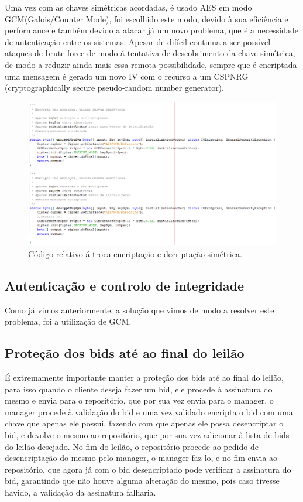 \documentclass[pdftex,12pt,a4paper]{report}
\begin{document}
Uma vez com as chaves simétricas acordadas, é usado AES em modo GCM(Galois/Counter Mode), foi escolhido este modo, devido à sua eficiência e performance e também devido a atacar já um novo problema, que é a necessidade de autenticação entre os sistemas.
Apesar de difícil continua a ser possível ataques de brute-force de modo á tentativa de descobrimento da chave simétrica, de modo a reduzir ainda mais essa remota possibilidade, sempre que é encriptada uma mensagem é gerado um novo IV com o recurso a um CSPNRG (cryptographically secure pseudo-random number generator).
\begin{figure}[h]
    \centering
    \includegraphics[width=15.0cm]{encrypt.png}
    \caption{Código relativo á troca encriptação e decriptação simétrica.}
    \label{fig:mesh1}
\end{figure}

\vskip 1.5cm
\subsection{Autenticação e controlo de integridade}
Como já vimos anteriormente, a solução que vimos de modo a resolver este problema, foi a utilização de GCM.

\vskip 1.5cm
\subsection{Proteção dos bids até ao final do leilão}
É extremamente importante manter a proteção dos bids até ao final do leilão, para isso quando o cliente deseja fazer um bid, ele procede à assinatura do mesmo e envia para o repositório, que por sua vez envia para o manager, o manager procede à validação do bid e uma vez validado encripta o bid  com uma chave que apenas ele possui, fazendo com que apenas ele possa desencriptar o bid, e devolve o mesmo ao repositório, que por sua vez adicionar à lista de bids do leilão desejado.
No fim do leilão, o repositório procede ao pedido de desencriptação do mesmo pelo manager, o manager faz-lo, e no fim envia ao repositório, que agora já com o bid desencriptado pode verificar a assinatura do bid, garantindo que não houve alguma alteração do mesmo, pois caso tivesse havido, a validação da assinatura falharia.
\end{document}
